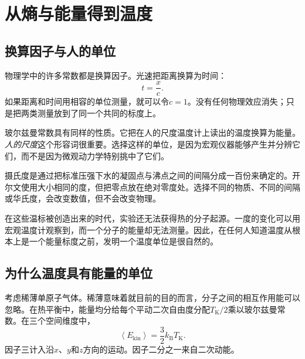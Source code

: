 \chapter{从熵与能量得到温度}


\section{换算因子与人的单位}

物理学中的许多常数都是换算因子。光速把距离换算为时间：
\begin{equation}
 t=\frac{x}{c}.
\end{equation}
如果距离和时间用相容的单位测量，就可以令\(c=1\)。没有任何物理效应消失；只是把两类测量放到了同一个共同的标度上。

玻尔兹曼常数具有同样的性质。它把在人的尺度温度计上读出的温度换算为能量。\emph{人的尺度}这个形容词很重要。选择这样的单位，是因为宏观仪器能够产生并分辨它们，而不是因为微观动力学特别挑中了它们。

摄氏度是通过把标准压强下水的凝固点与沸点之间的间隔分成一百份来确定的。开尔文使用大小相同的度，但把零点放在绝对零度处。选择不同的物质、不同的间隔或华氏度，会改变数值，但不会改变物理。

\begin{classroomqa}
\end{classroomqa}

在这些温标被创造出来的时代，实验还无法获得热的分子起源。一度的变化可以用宏观温度计观察到，而一个分子的能量却无法测量。因此，在任何人知道温度从根本上是一个能量标度之前，发明一个温度单位是很自然的。

\section{为什么温度具有能量的单位}

考虑稀薄单原子气体。稀薄意味着就目前的目的而言，分子之间的相互作用能可以忽略。在热平衡中，能量均分给每个平动二次自由度分配\(T_{\mathrm K}/2\)乘以玻尔兹曼常数。在三个空间维度中，
\begin{equation}
 \left\langle E_{\mathrm{kin}}\right\rangle
 =\frac{3}{2}k_{\mathrm B}T_{\mathrm K}.
 \label{eq:sm2-equipartition-kelvin}
\end{equation}
因子三计入沿\(x\)、\(y\)和\(z\)方向的运动。因子二分之一来自二次动能。

